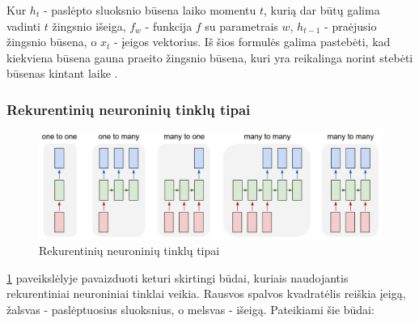 \documentclass{VUMIFPSbakalaurinis}
\begin{document}
Kur $h_t$ - paslėpto sluoksnio būsena laiko momentu $t$, kurią dar būtų galima vadinti $t$ žingsnio išeiga, $f_w$ - funkcija $f$ su parametrais $w$, $h_{t-1}$ - praėjusio žingsnio būsena, o $x_t$ - įeigos vektorius. Iš šios formulės galima pastebėti, kad kiekviena būsena gauna praeito žingsnio būsena, kuri yra reikalinga norint stebėti būsenas kintant laike	.


\subsubsection{Rekurentinių neuroninių tinklų tipai}

\begin{figure}[H]
	\centering
	\includegraphics[scale=0.3]{img/nn-tipai}
	\caption{Rekurentinių neuroninių tinklų tipai}
	\label{img:tipai}
\end{figure}

\ref{img:tipai} paveikslėlyje pavaizduoti keturi skirtingi būdai, kuriais naudojantis rekurentiniai neuroniniai tinklai veikia. Rausvos spalvos kvadratėlis reiškia įeigą, žalsvas - paslėptuosius sluoksnius, o melsvas - išeigą. Pateikiami šie būdai:
\end{document}
